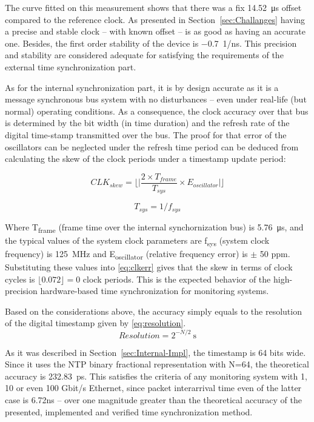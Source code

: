 \documentclass[journal]{IEEEtran}
\begin{document}
The curve fitted on this measurement shows that there was a fix \SI{14.52}{\micro\second} offset compared to the
reference clock. As presented in Section~\ref{sec:Challanges}
having a precise and stable clock -- with known offset -- is as good as having an accurate one. Besides,
the first order stability of the
device is \SI{-0.7}{1/\nano\second}. This precision and stability are considered adequate for satisfying the
requirements of the external time synchronization part.

As for the internal synchronization part, it is by design accurate as it is a message synchronous bus system with no
disturbances -- even under real-life (but normal) operating conditions. As a
consequence, the clock accuracy over that bus is determined by the bit width (in time duration) and the refresh rate of the digital
time-stamp transmitted over the bus. 
The proof for that error of the oscillators can be neglected under the refresh time period can be deduced from 
calculating the skew of the clock periods under a timestamp update period: 

\begin{equation}\label{eq:clkerr}
CLK_{skew} = \lfloor  \lvert \frac{2 \times T_{frame}}{T_{sys}} \times E_{oscillator} \rvert \rfloor
\end{equation}

\begin{equation}
 T_{sys} = 1/f_{sys}
\end{equation}

Where T\textsubscript{frame} (frame time over the internal synchornization bus) is \SI{5.76}{\micro\second}, and the typical values of the system clock parameters are
f\textsubscript{sys} (system clock frequency) is \SI{125}{\mega\hertz} and E\textsubscript{oscillator} (relative frequency error) is $\pm$ 50 ppm.
Substituting these values into \eqref{eq:clkerr} gives that the skew in terms of clock cycles is $\lfloor 0.072 \rfloor = 0$ clock periods. This is the expected behavior of the high-precision hardware-based time synchronization for monitoring systems.

Based on the considerations above, the accuracy simply equals to the resolution of the digital timestamp given by \eqref{eq:resolution}.
\begin{equation}\label{eq:resolution}
Resolution = 2^{-N/2} \SI{}{\second}
\end{equation}

As it was described in Section~\ref{sec:Internal-Impl}, the
timestamp is 64 bits wide. Since it uses the NTP binary fractional representation 
with N=64, the theoretical accuracy is \SI{232.83}{\pico\second}. This satisfies the criteria of any monitoring system with 1, 10 or even 100 Gbit/s Ethernet, since packet interarrival time even of the latter case is 6.72ns \cite{6ns_interarrival} -- over one magnitude greater than the theoretical accuracy of the presented, implemented and verified time synchronization method.
\end{document}
